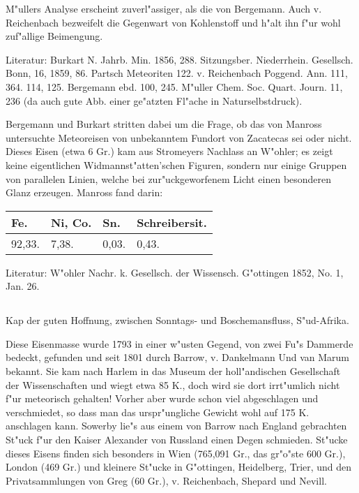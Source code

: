 \documentclass[a4paper, 11pt, oneside]{article}
\begin{document}
M"ullers Analyse erscheint zuverl"assiger, als die von Bergemann. Auch v. Reichenbach bezweifelt die Gegenwart von Kohlenstoff und h"alt ihn f"ur wohl zuf"allige Beimengung.

\normalsize
Literatur: Burkart N. Jahrb. Min. 1856, 288. Sitzungsber. Niederrhein. Gesellsch. Bonn, 16, 1859, 86. Partsch Meteoriten 122. v. Reichenbach Poggend. Ann. 111, 364. 114, 125. Bergemann ebd. 100, 245. M"uller Chem. Soc. Quart. Journ. 11, 236 (da auch gute Abb. einer ge"atzten Fl"ache in Naturselbstdruck).

\LARGE
Bergemann und Burkart stritten dabei um die Frage, ob das von Manross untersuchte Meteoreisen von unbekanntem Fundort von Zacatecas sei oder nicht. Dieses Eisen (etwa 6 Gr.) kam aus Stromeyers Nachlass an W"ohler; es zeigt keine eigentlichen Widmannst"atten'schen Figuren, sondern nur einige Gruppen von parallelen Linien, welche bei zur"uckgeworfenem Licht einen besonderen Glanz erzeugen. Manross fand darin:
\begin{table}[H]
    \centering\swabfamily\Large
    \begin{tabular}{l l l l}
        Fe. & Ni, Co. & Sn. & Schreibersit. \\ \hline
        92,33. & 7,38. & 0,03. & 0,43. \\
    \end{tabular}
\end{table}

\normalsize
Literatur: W"ohler Nachr. k. Gesellsch. der Wissensch. G"ottingen 1852, No. 1, Jan. 26.

\subsection{}
\LARGE
\paragraph{}
Kap der guten Hoffnung, zwischen Sonntags- und Boschemansfluss, S"ud-Afrika.

Diese Eisenmasse wurde 1793 in einer w"usten Gegend, von zwei Fu"s Dammerde bedeckt, gefunden und seit 1801 durch Barrow, v. Dankelmann Und van Marum bekannt. Sie kam nach Harlem in das Museum der holl"andischen Gesellschaft der Wissenschaften und wiegt etwa 85 K., doch wird sie dort irrt"umlich nicht f"ur meteorisch gehalten! Vorher aber wurde schon viel abgeschlagen und verschmiedet, so dass man das urspr"ungliche Gewicht wohl auf 175 K. anschlagen kann. Sowerby lie"s aus einem von Barrow nach England gebrachten St"uck f"ur den Kaiser Alexander von Russland einen Degen schmieden. St"ucke dieses Eisens finden sich besonders in Wien (765,091 Gr., das gr"o"ste 600 Gr.), London (469 Gr.) und kleinere St"ucke in G"ottingen, Heidelberg, Trier, und den Privatsammlungen von Greg (60 Gr.), v. Reichenbach, Shepard und Nevill.
\end{document}
